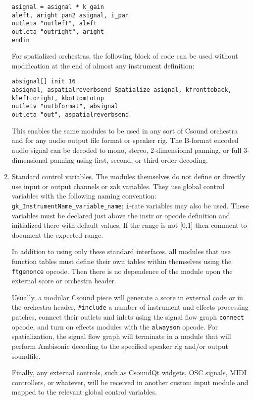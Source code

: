 \documentclass[12pt,letterpaper,onecolumn]{scrartcl}
\begin{document}
\begin{enumerate}
\begin{lstlisting}
asignal = asignal * k_gain
aleft, aright pan2 asignal, i_pan
outleta "outleft", aleft
outleta "outright", aright
endin
\end{lstlisting}
    
    \noindent For spatialized orchestras, the following block of code can be used without modification at the end of almost any instrument definition:
	
\begin{lstlisting}
absignal[] init 16
absignal, aspatialreverbsend Spatialize asignal, kfronttoback, klefttoright, kbottomtotop
outletv "outbformat", absignal
outleta "out", aspatialreverbsend
\end{lstlisting}

\noindent This enables the same modules to be used in any sort of Csound orchestra and for any audio output file format or speaker rig. The B-format encoded audio signal can be decoded to mono, stereo, 2-dimensional panning, or full 3-dimensional panning using first, second, or third order decoding. 

		\item Standard control variables. The modules themselves do not define or directly use input or output channels or zak variables. They use global control variables with the following naming convention: \texttt{gk\_InstrumentName\_variable\_name}; \texttt{i}-rate variables may also be used. These variables must be declared just above the instr or opcode definition and initialized there with default values. If the range is not [0,1] then comment to document the expected range.
		
In addition to using only these standard interfaces, all modules that use function tables must define their own tables within themselves using the \texttt{ftgenonce} opcode. Then there is no dependence of the module upon the external score or orchestra header.
		
Usually, a modular Csound piece will generate a score in external code or in the orchestra header, \texttt{\#include} a number of instrument and effects processing patches, connect their outlets and inlets using the signal flow graph \texttt{connect} opcode, and turn on effects modules with the \texttt{alwayson} opcode. For spatialization, the signal flow graph will terminate in a module that will perform Ambisonic decoding to the specified speaker rig and/or output soundfile.

Finally, any external controls, such as CsoundQt widgets, OSC signals, MIDI controllers, or whatever, will be received in another custom input module and mapped to the relevant global control variables.


\end{enumerate}
\end{document}
